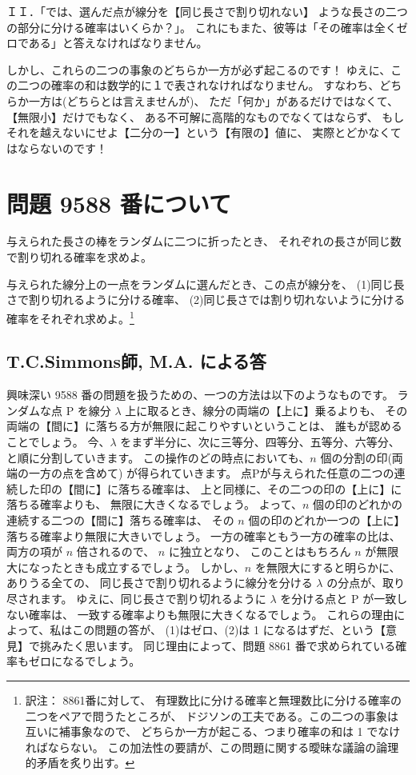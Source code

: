 \documentclass{article}
\begin{document}
ＩＩ．「では、選んだ点が線分を【同じ長さで割り切れない】
ような長さの二つの部分に分ける確率はいくらか？」。
これにもまた、彼等は「その確率は全くゼロである」と答えなければなりません。

 しかし、これらの二つの事象のどちらか一方が必ず起こるのです！
ゆえに、この二つの確率の和は数学的に１で表されなければなりません。
すなわち、どちらか一方は(どちらとは言えませんが)、
ただ「何か」があるだけではなくて、【無限小】だけでもなく、
ある不可解に高階的なものでなくてはならず、
もしそれを越えないにせよ【二分の一】という【有限の】値に、
実際とどかなくてはならないのです！

\section*{問題 9588 番について}

\begin{prob}[{\bf 8861}番 J.Brill, M.A. 出題]
与えられた長さの棒をランダムに二つに折ったとき、
それぞれの長さが同じ数で割り切れる確率を求めよ。
\end{prob}

\begin{prob}
与えられた線分上の一点をランダムに選んだとき、この点が線分を、
(1)同じ長さで割り切れるように分ける確率、
(2)同じ長さでは割り切れないように分ける確率をそれぞれ求めよ。\footnote{訳注：
8861番に対して、
有理数比に分ける確率と無理数比に分ける確率の二つをペアで問うたところが、
ドジソンの工夫である。この二つの事象は互いに補事象なので、
どちらか一方が起こる、つまり確率の和は 1 でなければならない。
この加法性の要請が、この問題に関する曖昧な議論の論理的矛盾を炙り出す。}
\end{prob}


\subsection*{T.C.Simmons師, M.A. による答}

 興味深い 9588 番の問題を扱うための、一つの方法は以下のようなものです。
ランダムな点 P を線分 $\lambda$ 上に取るとき、線分の両端の【上に】乗るよりも、
その両端の【間に】に落ちる方が無限に起こりやすいということは、
誰もが認めることでしょう。
今、$\lambda$ をまず半分に、次に三等分、四等分、五等分、六等分、と順に分割していきます。
この操作のどの時点においても、$n$ 個の分割の印(両端の一方の点を含めて)
が得られていきます。
点Pが与えられた任意の二つの連続した印の【間に】に落ちる確率は、
上と同様に、その二つの印の【上に】に落ちる確率よりも、
無限に大きくなるでしょう。
よって、$n$ 個の印のどれかの連続する二つの【間に】落ちる確率は、
その $n$ 個の印のどれか一つの【上に】落ちる確率より無限に大きいでしょう。
一方の確率ともう一方の確率の比は、両方の項が $n$ 倍されるので、
$n$ に独立となり、
このことはもちろん $n$ が無限大になったときも成立するでしょう。
しかし、$n$ を無限大にすると明らかに、ありうる全ての、
同じ長さで割り切れるように線分を分ける $\lambda$ の分点が、取り尽されます。
ゆえに、同じ長さで割り切れるように $\lambda$ を分ける点と P が一致しない確率は、
一致する確率よりも無限に大きくなるでしょう。
これらの理由によって、私はこの問題の答が、
(1)はゼロ、(2)は 1 になるはずだ、という【意見】で挑みたく思います。
  同じ理由によって、問題 8861 番で求められている確率もゼロになるでしょう。
\end{document}
